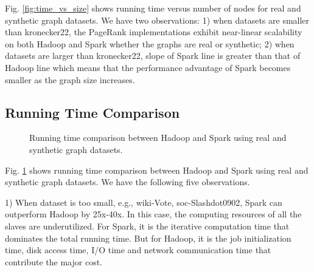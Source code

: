 \documentclass[12pt,conference,letterpaper]{IEEEtran}
\begin{document}
Fig. \ref{fig:time_vs_size} shows running time versus number of nodes for real and synthetic graph datasets. We have two observations: 1) when datasets are smaller than kronecker22, the PageRank implementations exhibit near-linear scalability on both Hadoop and Spark whether the graphs are real or synthetic; 2) when datasets are larger than kronecker22, slope of Spark line is greater than that of Hadoop line which means that the performance advantage of Spark becomes smaller as the graph size increases.

\subsection{Running Time Comparison}

\begin{figure}[!t]
\centering
{}
\caption{Running time comparison between Hadoop and Spark using real and synthetic graph datasets.}
\label{fig:hadoopsparkrunningtime}
\end{figure}

Fig. \ref{fig:hadoopsparkrunningtime} shows running time comparison between Hadoop and Spark using real and synthetic graph datasets. We have the following five observations. 

1) When dataset is too small, e.g., wiki-Vote, soc-Slashdot0902, Spark can outperform Hadoop by 25x-40x. In this case, the computing resources of all the slaves are underutilized. For Spark, it is the iterative computation time that dominates the total running time. But for Hadoop, it is the job initialization time, disk access time, I/O time and network communication time that contribute the major cost.   %
\end{document}
